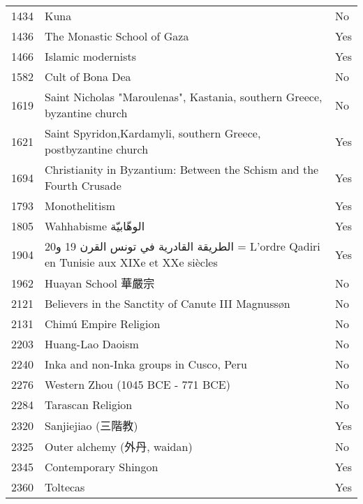 \begin{tabular}{rll}
1434 & Kuna & No \\
1436 & The Monastic School of Gaza & Yes \\
1466 & Islamic modernists & Yes \\
1582 & Cult of Bona Dea & No \\
1619 & Saint Nicholas "Maroulenas", Kastania, southern Greece, byzantine church & No \\
1621 & Saint Spyridon,Kardamyli, southern Greece, postbyzantine church & Yes \\
1694 & Christianity in Byzantium: Between the Schism and the Fourth Crusade & Yes \\
1793 & Monothelitism & Yes \\
1805 & Wahhabisme الوهّابيّة & Yes \\
1904 & الطريقة القادرية في تونس القرن  19 و20   =  L'ordre Qadiri en Tunisie aux XIXe et XXe siècles & Yes \\
1962 & Huayan School 華嚴宗 & No \\
2121 & Believers in the Sanctity of Canute III Magnussøn & No \\
2131 & Chimú Empire Religion & No \\
2203 & Huang-Lao Daoism & No \\
2240 & Inka and non-Inka groups in Cusco, Peru & No \\
2276 & Western Zhou (1045 BCE - 771 BCE) & No \\
2284 & Tarascan Religion & No \\
2320 & Sanjiejiao (三階教) & Yes \\
2325 & Outer alchemy (外丹, waidan) & No \\
2345 & Contemporary Shingon & Yes \\
2360 & Toltecas & Yes \\
\bottomrule
\end{tabular}
